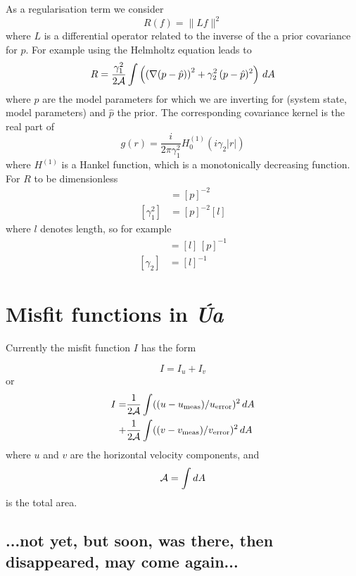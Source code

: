 \documentclass[10pt,a4paper]{book}
\newcommand{\Ua}{\textsl{\'Ua}\,}
\begin{document}
As a regularisation term we consider
\[
 R(f)=\| L f \|^2
\]
where $L$ is a differential operator related to the inverse of the
a prior covariance for $p$. For example using the Helmholtz equation leads to
\begin{equation}
R=  \frac{\gamma_1^2}{2\cal{A}} \int \left (  \left ( \nabla( p - \hat{p}) \right )^2 + \gamma_2^2 \, (p-\hat{p})^2 \right ) \, dA
\label{eq:HR}
\end{equation}
where $p$ are the model parameters  for which we are inverting for (system state, model
parameters) and $\hat{p}$ the prior. The corresponding covariance kernel is
the real part of
\begin{equation}
g(r)= \frac{i}{2 \pi \gamma_1^2} H^{(1)}_0 (i \gamma_2 |r|)
\label{eq:HR2}
\end{equation}
where $H^{(1)}$ is a Hankel function, which is a monotonically
decreasing function. For $R$ to be dimensionless
\begin{align*}
[\gamma_1^2 \gamma_2^2] &= [p]^{-2} \\
[\gamma_1^2]&= [p]^{-2} [l]
\end{align*}
where $l$ denotes length, so for example
\begin{align*}
[\gamma_1]&=[l] \, [p]^{-1} \\
[\gamma_2]&=[l]^{-1} 
\end{align*}




\section{Misfit functions in \Ua}


Currently the misfit function $I$ has the form

\[
  I=I_u+I_v
\]
or
\begin{align*}
I =&  \frac{1}{2\cal{A}} \int  ((u-u_{\mathrm{meas}})/u_{\mathrm{error}})^2 \, dA \\
   +&  \frac{1}{2\cal{A}} \int  ((v-v_{\mathrm{meas}})/v_{\mathrm{error}})^2 \, dA \\
\end{align*}
where $u$ and $v$ are the horizontal velocity components, and
\[
{\cal A}= \int dA
\]
is the total area.


\subsection{...not yet, but soon, was there, then disappeared, may come again...}
\end{document}
